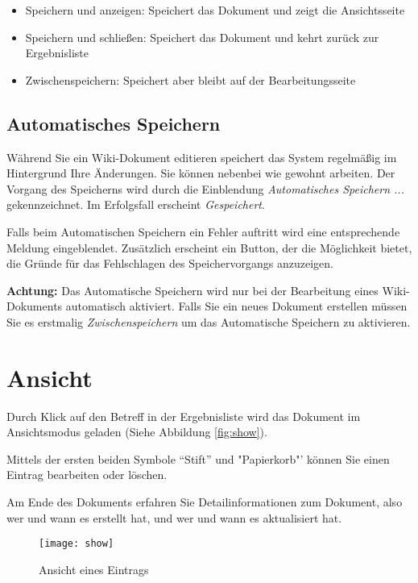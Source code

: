 \documentclass[article, a4paper, oneside, 11pt]{memoir}
\begin{document}
\begin{itemize}
\item Speichern und anzeigen: Speichert das Dokument und zeigt die Ansichtsseite
\item Speichern und schließen: Speichert das Dokument und kehrt zurück zur Ergebnisliste
\item Zwischenspeichern: Speichert aber bleibt auf der Bearbeitungsseite
\end{itemize}

\section{Automatisches Speichern}
Während Sie ein Wiki-Dokument editieren speichert das System regelmäßig im Hintergrund Ihre Änderungen. Sie können nebenbei wie gewohnt arbeiten. Der Vorgang des Speicherns wird durch die Einblendung \emph{Automatisches Speichern ...} gekennzeichnet. Im Erfolgsfall erscheint \emph{Gespeichert}. 

Falls beim Automatischen Speichern ein Fehler auftritt wird eine entsprechende Meldung eingeblendet. Zusätzlich erscheint ein Button, der die Möglichkeit bietet, die Gründe für das Fehlschlagen des Speichervorgangs anzuzeigen.

\textbf{Achtung:} Das Automatische Speichern wird nur bei der Bearbeitung eines Wiki-Dokuments automatisch aktiviert. Falls Sie ein neues Dokument erstellen müssen Sie es erstmalig \emph{Zwischenspeichern} um das Automatische Speichern zu aktivieren. 






\chapter{Ansicht}
Durch Klick auf den Betreff in der Ergebnisliste wird das Dokument im Ansichtsmodus geladen (Siehe Abbildung \vref{fig:show}).

Mittels der ersten beiden Symbole "`Stift"' und "Papierkorb"' können Sie einen Eintrag bearbeiten oder löschen.

Am Ende des Dokuments erfahren Sie Detailinformationen zum Dokument, also wer und wann es erstellt hat, und wer und wann es aktualisiert hat.

\begin{figure}[htp]
\centering
\texttt{[image: show]}
\caption{Ansicht eines Eintrags}
\label{fig:show}
\end{figure}
\end{document}
